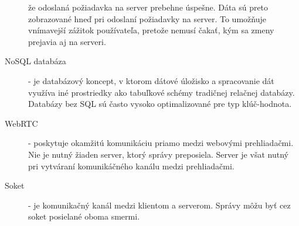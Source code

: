 \begin{description}
že odoslaná požiadavka na server prebehne úspešne. Dáta sú preto zobrazované hneď pri odoslaní
požiadavky na server. To umožňuje vnímavejší zážitok používateľa, pretože nemusí čakať, kým sa
zmeny prejavia aj na serveri.
\item [NoSQL databáza] - je databázový koncept, v ktorom dátové úložisko a spracovanie dát využíva
iné prostriedky ako tabuľkové schémy tradičnej relačnej databázy. Databázy bez SQL sú často vysoko
optimalizované pre typ klúč-hodnota.
\item [WebRTC] - poskytuje okamžitú komunikáciu priamo medzi webovými prehliadačmi. Nie je nutný
žiaden server, ktorý správy preposiela. Server je všat nutný pri vytváraní komunikáčného kanálu
medzi prehliadačmi.
\item [Soket] - je komunikačný kanál medzi klientom a serverom. Správy môžu byť cez soket posielané
oboma smermi.
\end{description}
